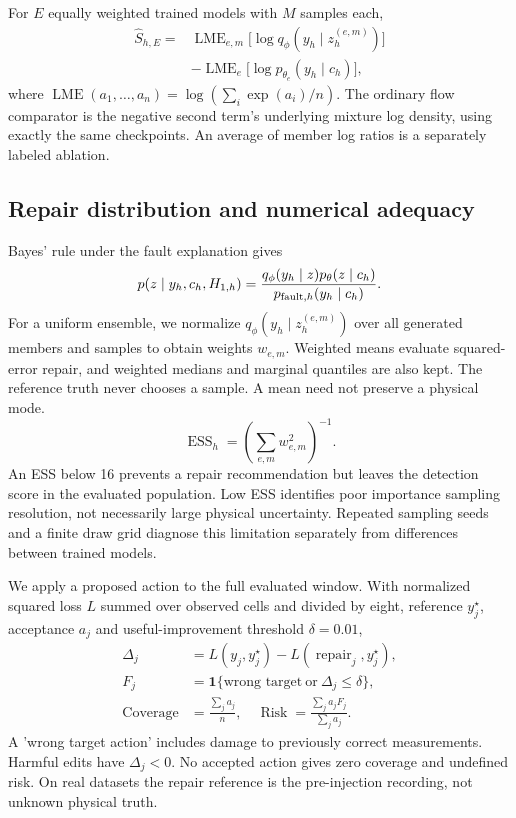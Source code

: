 \documentclass{llncs}
\newcommand{\1}{\mathbf{1}}
\newcommand{\LME}{\operatorname{LME}}
\begin{document}
For $E$ equally weighted trained models with $M$ samples each,
\begin{equation}
\begin{split}
 \widehat S_{h,E}={}&\LME_{e,m}\bigl[\log q_\phi(y_h\mid z_h^{(e,m)})\bigr]\\
 &-\LME_e\bigl[\log p_{\theta_e}(y_h\mid c_h)\bigr],
\end{split}
\end{equation}
where $\LME(a_1,\ldots,a_n)=\log(\sum_i\exp(a_i)/n)$. The ordinary flow comparator is the negative second term's underlying mixture log density, using exactly the same checkpoints. An average of member log ratios is a separately labeled ablation.





\subsection{Repair distribution and numerical adequacy}
Bayes' rule under the fault explanation gives
\begin{equation}
 p(z\mid y_h,c_h,H_{1,h})=
 \frac{q_\phi(y_h\mid z)p_\theta(z\mid c_h)}{p_{{\rm fault},h}(y_h\mid c_h)}.
\end{equation}
For a uniform ensemble, we normalize $q_\phi(y_h\mid z_h^{(e,m)})$ over all generated members and samples to obtain weights $w_{e,m}$. Weighted means evaluate squared-error repair, and weighted medians and marginal quantiles are also kept. The reference truth never chooses a sample. A mean need not preserve a physical mode.
\begin{equation}
 \operatorname{ESS}_h=\left(\sum_{e,m}w_{e,m}^2\right)^{-1}.
\end{equation}
An ESS below 16 prevents a repair recommendation but leaves the detection score in the evaluated population. Low ESS identifies poor importance sampling resolution, not necessarily large physical uncertainty. Repeated sampling seeds and a finite draw grid diagnose this limitation separately from differences between trained models.

We apply a proposed action to the full evaluated window. With normalized squared loss $L$ summed over observed cells and divided by eight, reference $y_j^\star$, acceptance $a_j$ and useful-improvement threshold $\delta=0.01$,
\begin{equation}
\begin{split}
 \Delta_j&=L(y_j,y_j^\star)-L(\operatorname{repair}_j,y_j^\star),\\
 F_j&=\1\{\text{wrong target}\ \text{or}\ \Delta_j\leq\delta\},\\
 \operatorname{Coverage}&=\frac{\sum_j a_j}{n},\quad
 \operatorname{Risk}=\frac{\sum_j a_jF_j}{\sum_j a_j}.
\end{split}
\end{equation}
A 'wrong target action' includes damage to previously correct measurements. Harmful edits have $\Delta_j<0$. No accepted action gives zero coverage and undefined risk. On real datasets the repair reference is the pre-injection recording, not unknown physical truth.
\end{document}
